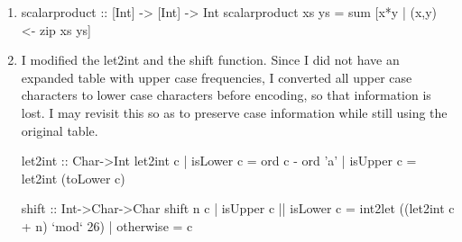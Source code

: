 \documentclass{article}
\begin{document}
\begin{enumerate}
\item 
\begin{code}
scalarproduct :: [Int] -> [Int] -> Int
scalarproduct xs ys = sum [x*y | (x,y) <- zip xs ys]
\end{code}

\item I modified the let2int and the shift function. Since I did not have an expanded table with upper case frequencies, I converted all upper case characters to lower case characters before encoding, so that information is lost. I may revisit this so as to preserve case information while still using the original table. 
\begin{code}
let2int :: Char->Int
let2int c | isLower c = ord c - ord 'a'
          | isUpper c = let2int (toLower c)

shift :: Int->Char->Char
shift n c | isUpper c || isLower c = int2let ((let2int c + n) `mod` 26)
          | otherwise = c
\end{code}
\end{enumerate}
\end{document}

